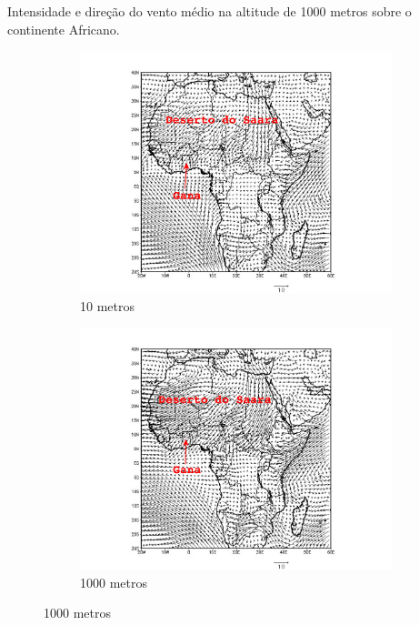\begin{frame}
  \frametitle{}
  Intensidade e direção do vento médio na altitude de 1000 metros 
               sobre o continente Africano.
  \begin{figure}[H]
    \centering
    \begin{subfigure}[b]{0.5\linewidth}
    \includegraphics[width=\linewidth]{../../inputs/grads/gimp/1000hPa/JAN_2008.pdf}
      \caption{10 metros}
    \end{subfigure}%
    \begin{subfigure}[b]{0.5\linewidth}
      \includegraphics[width=\linewidth]{../../inputs/grads/gimp/875hPa/JAN_2008.pdf}
      \caption{1000 metros}
    \end{subfigure}
  \end{figure}
\end{frame}

